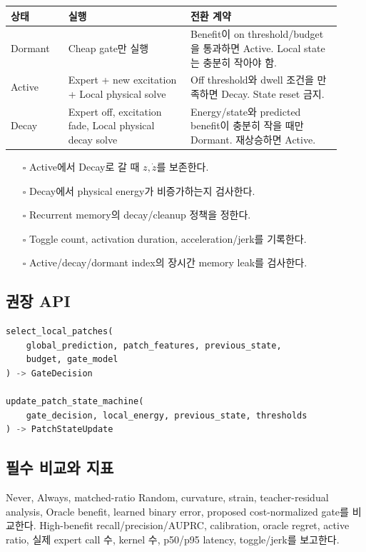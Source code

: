 \documentclass[10pt,a4paper]{article}
\newcommand{\todo}{\textcolor{TodoGray}{\(\square\)}}
\begin{document}
\begin{longtable}{L{0.16\linewidth}L{0.34\linewidth}L{0.42\linewidth}}
\toprule
상태 & 실행 & 전환 계약 \\
\midrule
Dormant & Cheap gate만 실행 & Benefit이 on threshold/budget을 통과하면 Active. Local state는 충분히 작아야 함. \\
Active & Expert + new excitation + Local physical solve & Off threshold와 dwell 조건을 만족하면 Decay. State reset 금지. \\
Decay & Expert off, excitation fade, Local physical decay solve & Energy/state와 predicted benefit이 충분히 작을 때만 Dormant. 재상승하면 Active. \\
\bottomrule
\end{longtable}

\begin{itemize}
  \item[\todo] Active에서 Decay로 갈 때 \(z,\dot z\)를 보존한다.
  \item[\todo] Decay에서 physical energy가 비증가하는지 검사한다.
  \item[\todo] Recurrent memory의 decay/cleanup 정책을 정한다.
  \item[\todo] Toggle count, activation duration, acceleration/jerk를 기록한다.
  \item[\todo] Active/decay/dormant index의 장시간 memory leak를 검사한다.
\end{itemize}

\subsection*{권장 API}

\begin{lstlisting}[language=Python]
select_local_patches(
    global_prediction, patch_features, previous_state,
    budget, gate_model
) -> GateDecision

update_patch_state_machine(
    gate_decision, local_energy, previous_state, thresholds
) -> PatchStateUpdate
\end{lstlisting}

\subsection*{필수 비교와 지표}

Never, Always, matched-ratio Random, curvature, strain, teacher-residual analysis,
Oracle benefit, learned binary error, proposed cost-normalized gate를 비교한다.
High-benefit recall/precision/AUPRC, calibration, oracle regret, active ratio,
실제 expert call 수, kernel 수, p50/p95 latency, toggle/jerk를 보고한다.
\end{document}
